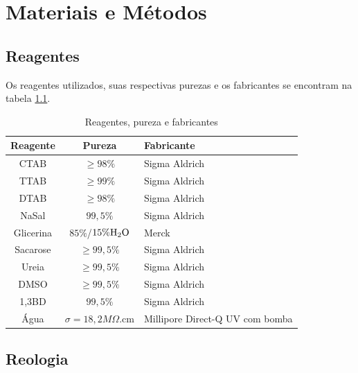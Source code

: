 \part{Materiais e Métodos}
	\chapter{Reagentes}
	
	Os reagentes utilizados, suas respectivas purezas e os fabricantes se encontram na tabela \ref{tab:reagentes}.
	
	\begin{table}[H]
		\IBGEtab%
		{\caption{Reagentes, pureza e fabricantes}
		\label{tab:reagentes}}%
	    {
		\centering
		\begin{tabular}{c c p{3.2cm}}
			\toprule
			Reagente  & Pureza                                      & Fabricante    \\ \midrule
			  CTAB    & $\geqslant 98\%$                            & Sigma Aldrich \\
			  TTAB    & $\geqslant 99\%$                            & Sigma Aldrich \\
			  DTAB	  & $\geqslant 98\%$							& Sigma Aldrich \\
			  NaSal   & $99{,}5\%$                                    & Sigma Aldrich \\
			Glicerina & $85\%$/$15\%\textnormal{H}_2\textnormal{O}$ & Merck         \\
			Sacarose  & $\geqslant 99{,}5\%$                          & Sigma Aldrich \\
			  Ureia   & $\geqslant 99{,}5\%$                          & Sigma Aldrich \\
			  DMSO    & $\geqslant 99{,}5\%$                          & Sigma Aldrich \\
			  1,3BD   & $99{,}5\%$                                    & Sigma Aldrich \\ 
			  Água    & $\sigma = 18{,}2M\Omega$.cm					& Millipore Direct-Q\textregistered{} \newline 3 UV com bomba  \\ \bottomrule
		\end{tabular}}%
		{}
	\end{table}
	
	\chapter{Reologia}
